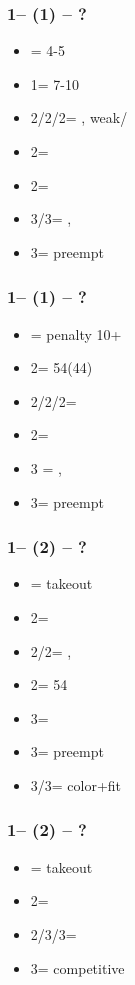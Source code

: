 \documentclass[12pt, a4paper]{report}
\begin{document}
\subsubsection*{1\diams -- (1\spades) -- ?}
\begin{itemize}
    \item \dbl = 4-5\hearts
    \item 1\nt = 7-10
    \item 2\clubs/2\diams/2\spades = \trsf{\diams/\hearts/\clubs}, weak/\gf
    \item 2\hearts = \diams\ \inv
    \item 2\nt = \inv
    \item 3\clubs/3\hearts = \nat, \inv
    \item 3\diams = preempt
\end{itemize}

\subsubsection*{1\diams -- (1\nt) -- ?}
\begin{itemize}
    \item \dbl = penalty 10+
    \item 2\clubs = 54\major (44)
    \item 2\diams/2\hearts/2\spades = \nf
    \item 2\nt = \inv\ \diams
    \item 3 = \nat, \inv\ \unbal
    \item 3\diams = preempt
\end{itemize}

\subsubsection*{1\diams -- (2\clubs) -- ?}
\begin{itemize}
    \item \dbl = takeout
    \item 2\diams = \nat
    \item 2\hearts/2\spades = \nat, \fonce
    \item 2\nt = 54\major
    \item 3\clubs = \diams\ \invp
    \item 3\diams = preempt
    \item 3\hearts/3\spades = color+fit
\end{itemize}

\subsubsection*{1\diams -- (2\hearts) -- ?}
\begin{itemize}
    \item \dbl = takeout
    \item 2\spades = \nat\ \nf
    \item 2\nt/3\clubs/3\hearts = \trsf{\clubs/\diams/\spades} \invp
    \item 3\diams = competitive
\end{itemize}
\end{document}
